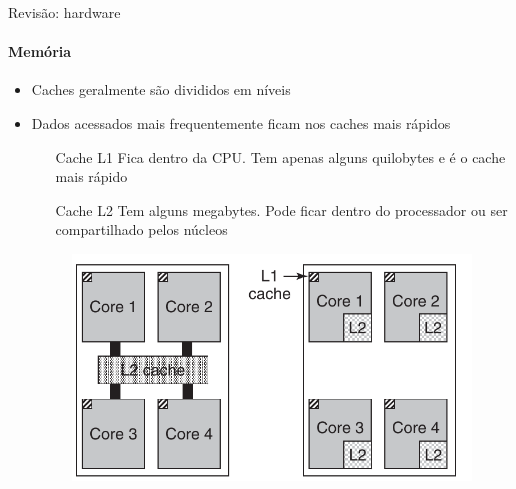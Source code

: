 \documentclass{beamer}
\begin{document}
\begin{frame}{Revisão: hardware}
	\framesubtitle{Memória}
	\begin{itemize}
		\item Caches geralmente são divididos em níveis
		\item Dados acessados mais frequentemente ficam nos caches mais rápidos
		\begin{itemize}
			\item[Cache L1] Fica dentro da CPU. Tem apenas alguns quilobytes e é o cache mais rápido
			\item[Cache L2] Tem alguns megabytes. Pode ficar dentro do processador ou ser compartilhado pelos núcleos
		\end{itemize}
		\begin{figure}
			\includegraphics[width=0.5\paperwidth]{resources/cache}
		\end{figure}
	\end{itemize}
\end{frame}
\end{document}
